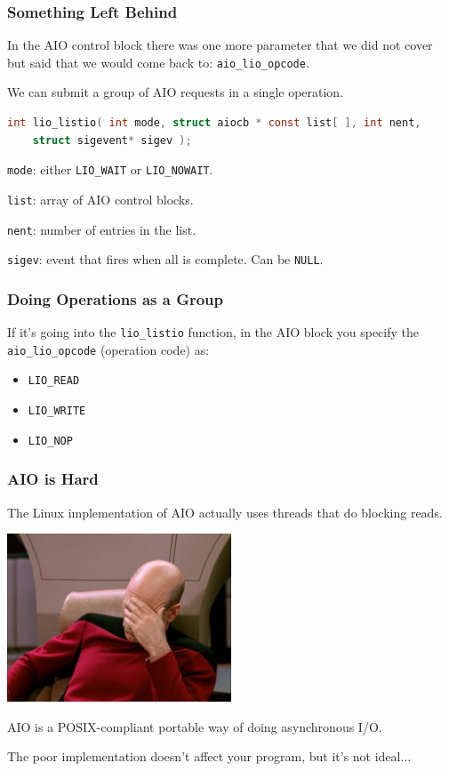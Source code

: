 \begin{frame}[fragile]
	\frametitle{Something Left Behind }

	In the AIO control block there was one more parameter that we did not cover but said that we would come back to: \texttt{aio\_lio\_opcode}.

	We can submit a group of AIO requests in a single operation.

	\begin{lstlisting}[language=C]
int lio_listio( int mode, struct aiocb * const list[ ], int nent, 
    struct sigevent* sigev );
\end{lstlisting}

	\texttt{mode}: either \texttt{LIO\_WAIT} or \texttt{LIO\_NOWAIT}.

	\texttt{list}: array of AIO control blocks.

	\texttt{nent}: number of entries in the list.

	\texttt{sigev}: event that fires when all is complete. Can be \texttt{NULL}.

\end{frame}


\begin{frame}
	\frametitle{Doing Operations as a Group}

	If it's going into the \texttt{lio\_listio} function, in the AIO block you specify the \texttt{aio\_lio\_opcode} (operation code) as:

	\begin{itemize}
		\item \texttt{LIO\_READ}
		\item \texttt{LIO\_WRITE}
		\item \texttt{LIO\_NOP}
	\end{itemize}

\end{frame}

\begin{frame}
	\frametitle{AIO is Hard}
	The Linux implementation of AIO actually uses threads that do blocking reads.

	\begin{center}
		\includegraphics[width=0.5\textwidth]{images/facepalm.jpg}
	\end{center}

	AIO is a POSIX-compliant portable way of doing asynchronous I/O.

	The poor implementation doesn't affect your program, but it's not ideal...

\end{frame}





